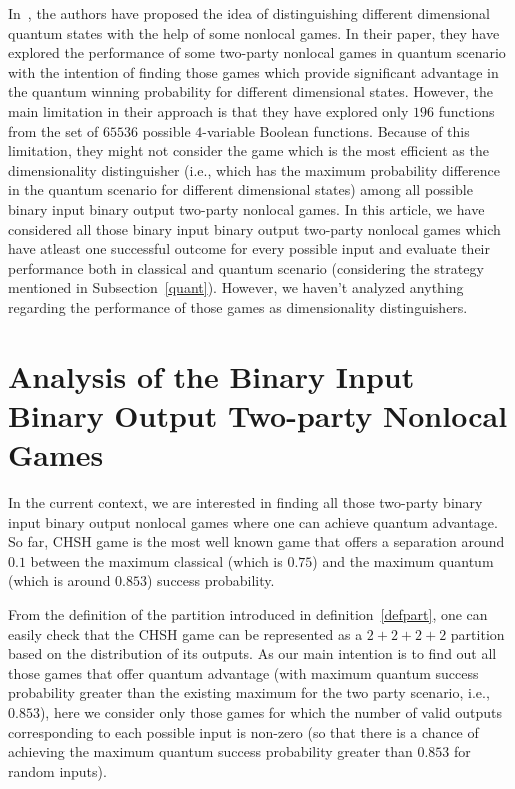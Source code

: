 \documentclass[]{svjour3}
\begin{document}
In~\cite{NGA19}, the authors have proposed the idea of distinguishing different dimensional quantum states with the help of some nonlocal games. In their paper, they have explored the performance of some two-party nonlocal games in quantum scenario with the intention of finding those games which provide significant advantage in the quantum winning probability for different dimensional states. However, the main limitation in their approach is that they have explored only $196$ functions from the set of $65536$ possible $4$-variable Boolean functions. Because of this limitation, they might not consider the game which is the most efficient as the dimensionality distinguisher (i.e., which has the maximum probability difference in the quantum scenario for different dimensional states) among all possible binary input binary output two-party nonlocal games. In this article, we have considered all those binary input binary output two-party nonlocal games which have atleast one successful outcome for every possible input and evaluate their performance both in classical and quantum scenario (considering the strategy mentioned in Subsection~\ref{quant}). However, we haven't analyzed anything regarding the performance of those games as dimensionality distinguishers.


\section{Analysis of the Binary Input Binary Output Two-party Nonlocal Games}
\label{main}

In the current context, we are interested in finding all those two-party binary input binary output nonlocal games where one can achieve quantum advantage. So far, CHSH game is the most well known game that offers a separation around $0.1$ between the maximum classical (which is $0.75$) and the maximum quantum (which is around $0.853$) success probability.

From the definition of the partition introduced in definition~\ref{defpart}, one can easily check that the CHSH game can be represented as a $2+2+2+2$ partition based on the distribution of its outputs. As our main intention is to find out all those games that offer quantum advantage (with maximum quantum success probability greater than the existing maximum for the two party scenario, i.e., $0.853$), here we consider only those games for which the number of valid outputs corresponding to each possible input is non-zero (so that there is a chance of achieving the maximum quantum success probability greater than $0.853$ for random inputs).
\end{document}

